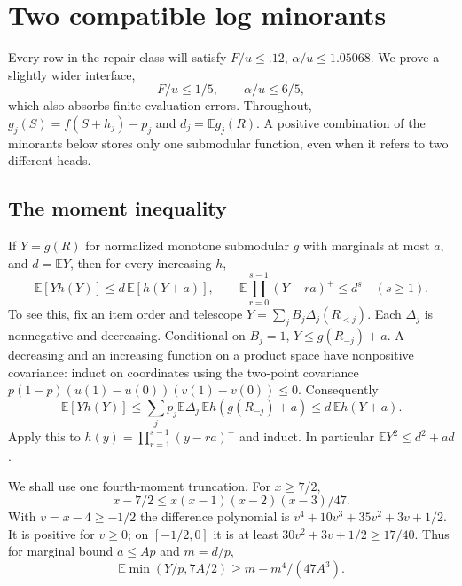\section{Two compatible log minorants}\label{simp:minorants}

Every row in the repair class will satisfy $F/u\le.12$,
$\alpha/u\le1.05068$. We prove a slightly wider interface,
\begin{equation}\label{simp:wide-domain}
                       F/u\le1/5,\qquad\alpha/u\le6/5,
\end{equation}
which also absorbs finite evaluation errors. Throughout,
$g_j(S)=f(S+h_j)-p_j$ and $d_j=\mathbb Eg_j(R)$.
A positive combination of the minorants below stores only one submodular
function, even when it refers to two different heads.

\subsection{The moment inequality}

If $Y=g(R)$ for normalized monotone submodular $g$ with marginals at most
$a$, and $d=\mathbb EY$, then for every increasing $h$,
\begin{equation}\label{eq:new-active-factorial-base}
 \mathbb E[Yh(Y)]\le d\,\mathbb E[h(Y+a)],\qquad
 \mathbb E\prod_{r=0}^{s-1}(Y-ra)^+\le d^s\quad(s\ge1).
\end{equation}
To see this, fix an item order and telescope
$Y=\sum_j B_j\Delta_j(R_{<j})$. Each $\Delta_j$ is nonnegative and
decreasing. Conditional on $B_j=1$, $Y\le g(R_{-j})+a$.
A decreasing and an increasing function on a product space have
nonpositive covariance: induct on coordinates using the two-point
covariance $p(1-p)(u(1)-u(0))(v(1)-v(0))\le0$.
Consequently
\[
 \mathbb E[Yh(Y)]\le\sum_jp_j\mathbb E\Delta_j\,
                \mathbb Eh(g(R_{-j})+a)
 \le d\,\mathbb Eh(Y+a).
\]
Apply this to $h(y)=\prod_{r=1}^{s-1}(y-ra)^+$ and induct.
In particular $\mathbb EY^2\le d^2+ad$.

We shall use one fourth-moment truncation. For $x\ge7/2$,
\begin{equation}\label{eq:new-active-quartic-tail}
 x-7/2\le x(x-1)(x-2)(x-3)/47.
\end{equation}
With $v=x-4\ge-1/2$ the difference polynomial is
$v^4+10v^3+35v^2+3v+1/2$. It is positive for $v\ge0$; on
$[-1/2,0]$ it is at least $30v^2+3v+1/2\ge17/40$.
Thus for marginal bound $a\le Ap$ and $m=d/p$,
\begin{equation}\label{simp:truncated-moment}
 \mathbb E\min(Y/p,7A/2)\ge m-m^4/(47A^3).
\end{equation}

